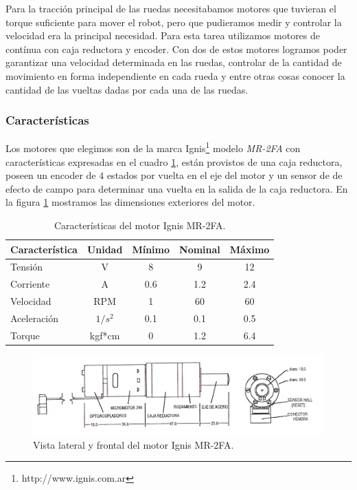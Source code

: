Para la tracci\'on principal de las ruedas necesitabamos motores que tuvieran el torque suficiente para mover el robot, pero que pudieramos medir y
controlar la velocidad era la principal necesidad. Para esta tarea utilizamos motores de cont\'inua con caja reductora y encoder.
Con dos de estos motores logramos poder garantizar una velocidad determinada en las ruedas, controlar de la cantidad de movimiento en forma
independiente en cada rueda y entre otras cosas conocer la cantidad de las vueltas dadas por cada una de las ruedas.

\subsubsection{Caracter\'isticas}
\label{h_actuadores_motorDC_caracteristicas}

Los motores que elegimos son de la marca Ignis\footnote{http://www.ignis.com.ar} modelo \emph{MR-2FA} con caracter\'isticas expresadas en el cuadro
\ref{hT_motorDC}, est\'an provistos de una caja reductora, poseen un encoder de $4$ estados por vuelta en el eje del motor y un sensor de de efecto
de campo para determinar una vuelta en la salida de la caja reductora.
En la figura \ref{hF_motorDC} mostramos las dimensiones exteriores del motor.

\begin{table}
	\begin{center}
		\begin{tabular}{|l|c|c|c|c|}
			\hline
			Caracter\'istica & Unidad & M\'inimo & Nominal & M\'aximo \\
			\hline
			Tensi\'on & V & 8 & 9 & 12 \\
			Corriente & A & 0.6 & 1.2 & 2.4 \\
			Velocidad & RPM & 1 & 60 & 60 \\
			Aceleraci\'on & $1/s^{2}$ & 0.1 & 0.1 & 0.5 \\
			Torque & kgf*cm & 0 & 1.2 & 6.4 \\
			\hline
		\end{tabular}
	\end{center}
	\caption{Caracter\'isticas del motor Ignis MR-2FA.}
	\label{hT_motorDC}
\end{table}

\begin{figure}[ht]
	\centering
	\includegraphics[scale=1]{figuras/MR2-FA.png}
	\caption{Vista lateral y frontal del motor Ignis MR-2FA.}
	\label{hF_motorDC}
\end{figure}

